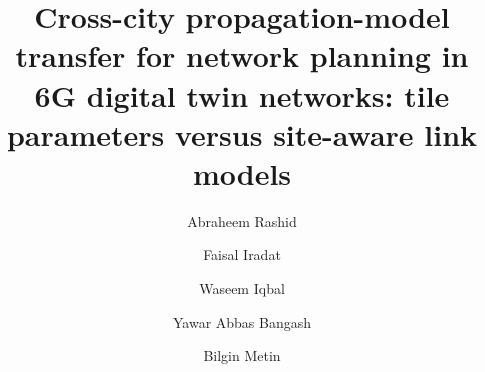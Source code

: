 \documentclass[final,5p,times,twocolumn]{elsarticle}
\theoremstyle{plain}
\begin{document}
\begin{frontmatter}

\title{Cross-city propagation-model transfer for network planning in 6G
digital twin networks: tile parameters versus site-aware link models}

\author[bru]{Abraheem Rashid}
\author[iba]{Faisal Iradat}
\author[squ]{Waseem Iqbal}
\author[sun]{Yawar Abbas Bangash}
\author[bou]{Bilgin Metin}
\address[bru]{Department of Computer Science, Brunel University London,
London, United Kingdom}
\address[iba]{Department of Computer Science, School of Mathematics and
Science, Institute of Business Administration, Karachi, Pakistan}
\address[squ]{Department of Electrical and Computer Engineering, Sultan
Qaboos University, Muscat, Oman}
\address[sun]{School of Computing and Artificial Intelligence, FET, Sunway
University, Selangor Darul Ehsan, Malaysia}
\address[bou]{Department of Management Information Systems,
Bo\u{g}azi\c{c}i University, \.{I}stanbul, T\"urkiye}

%

\end{frontmatter}

%
%
%
%
%
%
%
%



\end{document}
